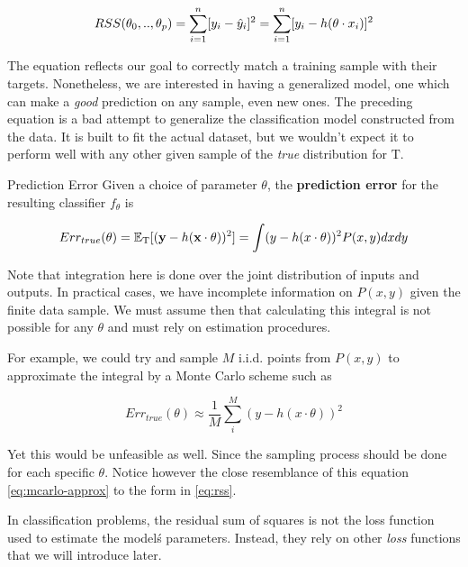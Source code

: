 \begin{equation} \label{eq:rss}
RSS(\theta_0,..,\theta_p)  = \sum_{i=1}^n [y_i - \hat{y}_i]^2  \\
=  \sum_{i=1}^n [y_i - h( \theta \cdot x_i)]^2
\end{equation}

The equation reflects our goal to correctly match a training sample with their targets. Nonetheless, we are interested in having a generalized model, one which can make a \textit{good} prediction on any sample, even new ones. The preceding equation is a bad attempt to generalize the classification model constructed from the data. It is built to fit the actual dataset, but we wouldn't expect it to perform well with any other given sample of the \textit{true} distribution for $\mathrm{T}$.

\begin{definition}{Prediction Error}
Given a choice of parameter $\theta$, the \textbf{prediction error} for the resulting classifier $f_\theta$ is

\begin{equation}
    Err_{true}(\theta)  = \operatorname{\mathbb{E}}_{ \mathrm{T}}[(\textbf{y} - h(\textbf{x} \cdot \theta) )^2] \\
    = \int (y - h(x \cdot \theta) )^2 P(x,y)dxdy
\end{equation}

\end{definition}

Note that integration here is done over the joint distribution of inputs and outputs. In practical cases, we have incomplete information on $P(x,y)$ given the finite data sample.
We must assume then that calculating this integral is not possible for any $\theta$ and must rely on estimation procedures.

For example, we could try and sample $M$ i.i.d. points from $P(x,y)$ to approximate the integral by a Monte Carlo scheme such as

\begin{equation} \label{eq:mcarlo-approx}
    Err_{true}(\theta)  \approx \frac{1}{M} \sum_i^M ( y - h(x \cdot \theta) )^2
\end{equation}

Yet this would be unfeasible as well. Since the sampling process should be done for each specific $\theta$. Notice however the close resemblance of this equation \ref{eq:mcarlo-approx} to the form in \ref{eq:rss}.

In classification problems, the residual sum of squares is not the loss function used to estimate the model\'s parameters. Instead, they rely on other \textit{loss} functions that we will introduce later.

